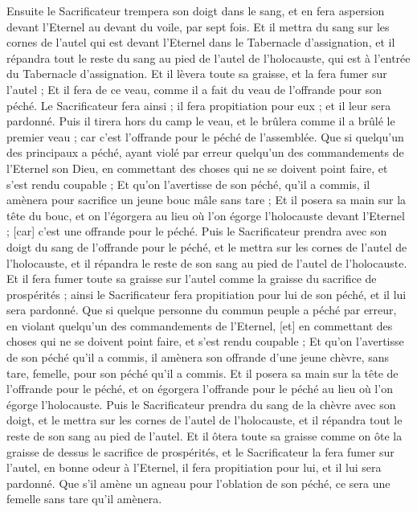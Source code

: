 \begin{multicols}{2}
Ensuite le Sacrificateur trempera son doigt dans le sang, et en fera aspersion devant l'Eternel au devant du voile, par sept fois.
Et il mettra du sang sur les cornes de l'autel qui est devant l'Eternel dans le Tabernacle d'assignation, et il répandra tout le reste du sang au pied de l'autel de l'holocauste, qui est à l'entrée du Tabernacle d'assignation.
Et il lèvera toute sa graisse, et la fera fumer sur l'autel ;
Et il fera de ce veau, comme il a fait du veau de l'offrande pour son péché. Le Sacrificateur fera ainsi ; il fera propitiation pour eux ; et il leur sera pardonné.
Puis il tirera hors du camp le veau, et le brûlera comme il a brûlé le premier veau ; car c'est l'offrande pour le péché de l'assemblée.
Que si quelqu'un des principaux a péché, ayant violé par erreur quelqu'un des commandements de l'Eternel son Dieu, en commettant des choses qui ne se doivent point faire, et s'est rendu coupable ;
Et qu'on l'avertisse de son péché, qu'il a commis, il amènera pour sacrifice un jeune bouc mâle sans tare ;
Et il posera sa main sur la tête du bouc, et on l'égorgera au lieu où l'on égorge l'holocauste devant l'Eternel ; [car] c'est une offrande pour le péché.
Puis le Sacrificateur prendra avec son doigt du sang de l'offrande pour le péché, et le mettra sur les cornes de l'autel de l'holocauste, et il répandra le reste de son sang au pied de l'autel de l'holocauste.
Et il fera fumer toute sa graisse sur l'autel comme la graisse du sacrifice de prospérités ; ainsi le Sacrificateur fera propitiation pour lui de son péché, et il lui sera pardonné.
Que si quelque personne du commun peuple a péché par erreur, en violant quelqu'un des commandements de l'Eternel, [et] en commettant des choses qui ne se doivent point faire, et s'est rendu coupable ;
Et qu'on l'avertisse de son péché qu'il a commis, il amènera son offrande d'une jeune chèvre, sans tare, femelle, pour son péché qu'il a commis.
Et il posera sa main sur la tête de l'offrande pour le péché, et on égorgera l'offrande pour le péché au lieu où l'on égorge l'holocauste.
Puis le Sacrificateur prendra du sang de la chèvre avec son doigt, et le mettra sur les cornes de l'autel de l'holocauste, et il répandra tout le reste de son sang au pied de l'autel.
Et il ôtera toute sa graisse comme on ôte la graisse de dessus le sacrifice de prospérités, et le Sacrificateur la fera fumer sur l'autel, en bonne odeur à l'Eternel, il fera propitiation pour lui, et il lui sera pardonné.
Que s'il amène un agneau pour l'oblation de son péché, ce sera une femelle sans tare qu'il amènera.

\end{multicols}
